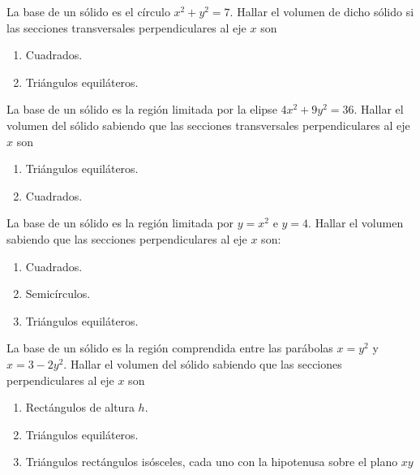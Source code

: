 \item La base de un sólido es el círculo $x^2 + y^2 = 7$. Hallar el volumen de dicho sólido si las secciones transversales perpendiculares al eje $x$ son
\begin{multicols}{2}
  \begin{enumerate}
    \item Cuadrados.
    \item Triángulos equiláteros.
  \end{enumerate}
\end{multicols} 

\item La base de un sólido es la región limitada por la elipse $4x^2 + 9y^2 = 36$. Hallar el volumen del sólido sabiendo que las secciones transversales perpendiculares al eje $x$ son
\begin{multicols}{2}
  \begin{enumerate}
    \item Triángulos equiláteros.
    \item Cuadrados.
  \end{enumerate}
\end{multicols} 

\item La base de un sólido es la región limitada por $y = x^2$ e $y = 4$. Hallar el volumen sabiendo que las secciones perpendiculares al eje $x$ son:
\begin{multicols}{2}
  \begin{enumerate}
    \item Cuadrados.
    \item Semicírculos.
    \item Triángulos equiláteros.
  \end{enumerate}
\end{multicols} 

\item La base de un sólido es la región comprendida entre las parábolas $x = y^2$ y $x = 3 - 2y^2$. Hallar el volumen del sólido sabiendo que las secciones perpendiculares al eje $x$ son 
\begin{multicols}{2}
  \begin{enumerate}
    \item Rectángulos de altura $h$.
    \item Triángulos equiláteros.
    \item Triángulos rectángulos isósceles, cada uno con la hipotenusa sobre el plano $xy$
  \end{enumerate}
\end{multicols} 

